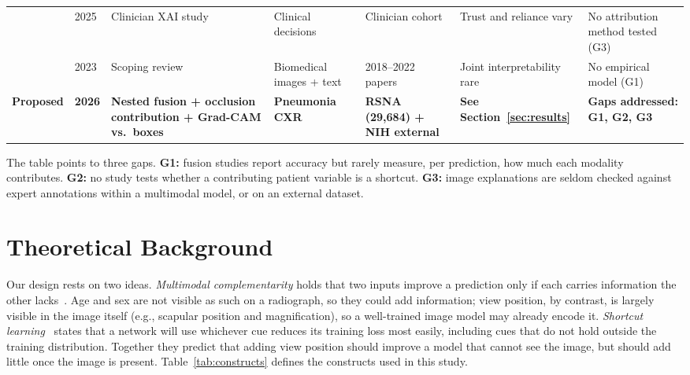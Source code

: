 \documentclass[conference]{IEEEtran}
\begin{document}
\begin{table}[!t]
\begin{tabular}{@{}p{1.2cm}p{0.6cm}p{2.9cm}p{2.0cm}p{2.4cm}p{3.1cm}p{3.6cm}@{}}
\cite{nicolson2025human} & 2025 & Clinician XAI study & Clinical decisions & Clinician cohort & Trust and reliance vary & No attribution method tested (G3) \\
\cite{sun2023scoping} & 2023 & Scoping review & Biomedical images + text & 2018--2022 papers & Joint interpretability rare & No empirical model (G1) \\
\midrule
\textbf{Proposed} & \textbf{2026} & \textbf{Nested fusion + occlusion contribution + Grad-CAM vs.\ boxes} & \textbf{Pneumonia CXR} & \textbf{RSNA (29,684) + NIH external} & \textbf{See Section~\ref{sec:results}} & \textbf{Gaps addressed: G1, G2, G3} \\
\bottomrule
\end{tabular}
\end{table}

The table points to three gaps. \textbf{G1:} fusion studies report accuracy but rarely measure, per prediction, how much each modality contributes. \textbf{G2:} no study tests whether a contributing patient variable is a shortcut. \textbf{G3:} image explanations are seldom checked against expert annotations within a multimodal model, or on an external dataset.

\section{Theoretical Background}
\label{sec:theory}

Our design rests on two ideas. \emph{Multimodal complementarity} holds that two inputs improve a prediction only if each carries information the other lacks~\cite{acosta2022multimodal}. Age and sex are not visible as such on a radiograph, so they could add information; view position, by contrast, is largely visible in the image itself (e.g., scapular position and magnification), so a well-trained image model may already encode it. \emph{Shortcut learning}~\cite{geirhos2020shortcut} states that a network will use whichever cue reduces its training loss most easily, including cues that do not hold outside the training distribution. Together they predict that adding view position should improve a model that cannot see the image, but should add little once the image is present. Table~\ref{tab:constructs} defines the constructs used in this study.
\end{document}
